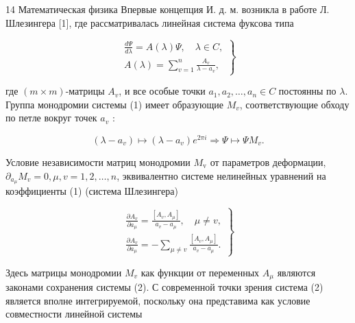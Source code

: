 \documentclass[10pt]{article}
\begin{document}
14 Математическая физика Впервые концепция И. д. м. возникла в работе Л. Шлезингера [1], где рассматривалась линейная система фуксова типа



\[

\left.\begin{array}{l}

\frac{d \Psi}{d \lambda}=A(\lambda) \Psi, \quad \lambda \in C, \\

A(\lambda)=\sum_{v=1}^{n} \frac{A_{v}}{\lambda-a_{v}},

\end{array}\right\}

\]



где $(m \times m)$-матрицы $A_{v}$, и все особые точки $a_{1}, a_{2}, \ldots, a_{n} \in C$ постоянны по $\lambda$. Группа монодромии системы (1) имеет образующие $M_{v}$, соответствующие обходу по петле вокруг точек $a_{v}$ :



\[

\left(\lambda-a_{v}\right) \mapsto\left(\lambda-a_{v}\right) e^{2 \pi i} \Rightarrow \Psi \mapsto \Psi M_{v} .

\]



Условие независимости матриц монодромии $M_{\mathrm{v}}$ от параметров деформации, $\partial_{a_{\mu}} M_{v}=0, \mu, v=1,2, \ldots, n$, эквивалентно системе нелинейных уравнений на коэффициенты (1) (система Шлезингера)



\[

\left.\begin{array}{l}

\frac{\partial A_{v}}{\partial a_{\mu}}=\frac{\left[A_{v}, A_{\mu}\right]}{a_{v}-a_{\mu}}, \quad \mu \neq v, \\

\frac{\partial A_{v}}{\partial a_{\mu}}=-\sum_{\mu \neq v} \frac{\left[A_{v}, A_{\mu}\right]}{a_{v}-a_{\mu}} .

\end{array}\right\}

\]



Здесь матрицы монодромии $M_{v}$ как функции от переменных $A_{\mu}$ являются законами сохранения системы (2). С современной точки зрения система (2) является вполне интегрируемой, поскольку она представима как условие совместности линейной системы
\end{document}
